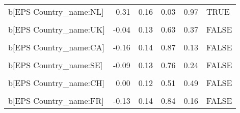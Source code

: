 \begin{table}
\begin{tabular}[t]{lrrrrl}
b[EPS Country\_name:NL] & 0.31 & 0.16 & 0.03 & 0.97 & TRUE\\
\cellcolor{gray!10}{b[(Intercept) Country\_name:UK]} & \cellcolor{gray!10}{-0.03} & \cellcolor{gray!10}{0.35} & \cellcolor{gray!10}{0.54} & \cellcolor{gray!10}{0.46} & \cellcolor{gray!10}{FALSE}\\
b[EPS Country\_name:UK] & -0.04 & 0.13 & 0.63 & 0.37 & FALSE\\
\cellcolor{gray!10}{b[(Intercept) Country\_name:CA]} & \cellcolor{gray!10}{-0.14} & \cellcolor{gray!10}{0.36} & \cellcolor{gray!10}{0.65} & \cellcolor{gray!10}{0.35} & \cellcolor{gray!10}{FALSE}\\
b[EPS Country\_name:CA] & -0.16 & 0.14 & 0.87 & 0.13 & FALSE\\
\cellcolor{gray!10}{b[(Intercept) Country\_name:SE]} & \cellcolor{gray!10}{-0.07} & \cellcolor{gray!10}{0.36} & \cellcolor{gray!10}{0.58} & \cellcolor{gray!10}{0.42} & \cellcolor{gray!10}{FALSE}\\
b[EPS Country\_name:SE] & -0.09 & 0.13 & 0.76 & 0.24 & FALSE\\
\cellcolor{gray!10}{b[(Intercept) Country\_name:CH]} & \cellcolor{gray!10}{0.00} & \cellcolor{gray!10}{0.35} & \cellcolor{gray!10}{0.50} & \cellcolor{gray!10}{0.50} & \cellcolor{gray!10}{FALSE}\\
b[EPS Country\_name:CH] & 0.00 & 0.12 & 0.51 & 0.49 & FALSE\\
\cellcolor{gray!10}{b[(Intercept) Country\_name:FR]} & \cellcolor{gray!10}{-0.09} & \cellcolor{gray!10}{0.38} & \cellcolor{gray!10}{0.59} & \cellcolor{gray!10}{0.41} & \cellcolor{gray!10}{FALSE}\\
b[EPS Country\_name:FR] & -0.13 & 0.14 & 0.84 & 0.16 & FALSE\\
\bottomrule
\end{tabular}
\end{table}

